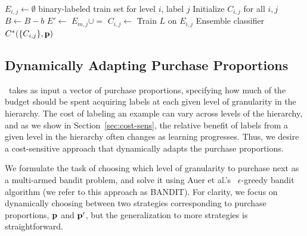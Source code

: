 \documentclass[10pt, conference, compsocconf]{IEEEtran}
\newcommand{\sys}{\Call{Hal}{}} %
\begin{document}
\begin{algorithm}[ht]
\small{
\caption{Method for learning the concept at the root of labeling tree $T$.  
See text for 
Purchase and LabelMap.
}
\label{alg:treetrain}
\begin{algorithmic}
\State  $E_{i,j} \gets \emptyset$  \Comment binary-labeled train set for
level $i$, label $j$
\State Initialize $C_{i,j}$ for all $i, j$
  \State $B \gets B-b$
    \State $E' \gets$ 
           \State $E_{m,j} \cup=$  
       \EndFor
    \EndFor
  \EndFor
    \State $C_{i,j} \gets$ Train $L$ on $E_{i,j}$
  \EndFor
  \EndFor
\EndWhile
\State \Return Ensemble classifier $C^*(\{C_{i,j}\}, {\bf p})$
\EndFunction
\end{algorithmic}
}
\end{algorithm}

\subsection{Dynamically Adapting Purchase Proportions}
\label{sec:adaptive}

\sys\ takes as input a vector of purchase proportions, specifying how much of the budget should be
spent acquiring labels at each given level of granularity in the hierarchy.  The cost of labeling an
example can
vary across levels of the hierarchy, and as we show in Section~\ref{sec:cost-sens}, the relative
benefit of labels from a given
level in the hierarchy often changes as learning progresses.  Thus, we desire a cost-sensitive
approach that dynamically adapts the purchase proportions.

We formulate the task of choosing which level of granularity to purchase next as a
multi-armed bandit problem, and solve it using
Auer et al.'s~\cite{Auer2002} $\epsilon$-greedy bandit algorithm (we refer to
this approach as BANDIT).  For clarity, we focus on dynamically choosing
between two strategies corresponding to purchase proportions, ${\bf p}$ and ${\bf p'}$,
but the generalization to more strategies is straightforward.
\end{document}
